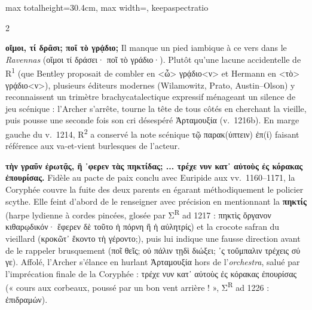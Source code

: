 \documentclass[11pt,twoside]{book}
\newcommand{\expo}[1]{\textsuperscript{#1}}
\newcommand{\Run}{R\expo{1}}
\newcommand{\Rdeux}{R\expo{2}}
\newcommand{\grec}[1]{{\policeGr #1}}
\begin{document}
\begin{adjustbox}{max totalheight=30.4cm, max width=\textwidth, keepaspectratio}
\begin{minipage}{\textwidth}
{\begin{multicols}{2}
\par\vspace{1.5pt}
 \textbf{οἴμοι, τί δρᾶσι; ποῖ τὸ γρᾴδιο;} Il manque un pied iambique à ce vers dans le \textit{Ravennas} (\grec{οἴμοι τί δράσει· ποῖ τὸ γράδιο·}). Plutôt qu'une lacune accidentelle de \Run{} (que Bentley proposait de combler en \grec{<ὦ> γρᾴδιο<ν>} et Hermann en \grec{<τὸ> γρᾴδιο<ν>}), plusieurs éditeurs modernes (Wilamowitz, Prato, Austin--Olson) y reconnaissent un trimètre brachycatalectique expressif ménageant un silence de jeu scénique : l'Archer s'arrête, tourne la tête de tous côtés en cherchant la vieille, puis pousse une seconde fois son cri désespéré \grec{Ἀρταμουξία} (v.~1216b). En marge gauche du v.~1214, \Rdeux{} a conservé la note scénique \grec{τῷ παρακ(ύπτειν) ἐπ(ί)} faisant référence aux va-et-vient burlesques de l'acteur.
\par\vspace{1.5pt}
 \textbf{τὴν γραῦν ἐρωτᾷς, ἣ ᾽φερεν τὰς πηκτίδας; ... τρέχε νυν κατ᾽ αὐτοὺς ἐς κόρακας ἐπουρίσας.} Fidèle au pacte de paix conclu avec Euripide aux vv.~1160–1171, la Coryphée couvre la fuite des deux parents en égarant méthodiquement le policier scythe. Elle feint d'abord de le renseigner avec précision en mentionnant la \textbf{\grec{πηκτίς}} (harpe lydienne à cordes pincées, glosée par {\policeGr Σ}\expo{R} ad 1217 : \grec{πηκτὶς ὄργανον κιθαρῳδικόν· ἔφερεν δὲ τοῦτο ἡ πόρνη ἢ ἡ αὐλητρίς}) et la crocote safran du vieillard (\grec{κροκῶτ᾽ ἔκοντο τὴ γέροντο;}), puis lui indique une fausse direction avant de le rappeler brusquement (\grec{ποῖ θεῖς; οὐ πάλιν τῃδὶ διώξει; ᾽ς τοὔμπαλιν τρέχεις σύ γε}). Affolé, l'Archer s'élance en hurlant \grec{Ἀρταμουξία} hors de l'\textit{orchestra}, salué par l'imprécation finale de la Coryphée : \grec{τρέχε νυν κατ᾽ αὐτοὺς ἐς κόρακας ἐπουρίσας} (« cours aux corbeaux, poussé par un bon vent arrière ! », {\policeGr Σ}\expo{R} ad 1226 : \grec{ἐπιδραμών}).
\par\end{multicols}}
\end{minipage}\end{adjustbox}
\newpage
\end{document}
